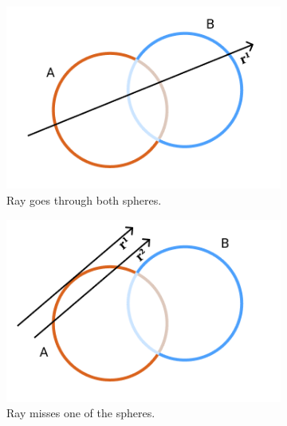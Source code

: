\documentclass[a4paper,11pt,oneside]{article}
\begin{document}
\begin{figure}[ht]
     \centering
     \begin{subfigure}[b]{0.3\textwidth}
         \centering
         \includegraphics[width=\textwidth]{section3/3.4/union-case-1.png}
         \caption{Ray goes through both spheres.}
         \label{sec3.4:union-case1}
     \end{subfigure}
     \hfill
     \begin{subfigure}[b]{0.3\textwidth}
         \centering
         \includegraphics[width=\textwidth]{section3/3.4/union-case-2.png}
         \caption{Ray misses one of the spheres.}
          \label{sec3.4:union-case2}
     \end{subfigure}
     \hfill
     \begin{subfigure}[b]{0.3\textwidth}
         \centering

\end{subfigure}
\end{figure}
\end{document}
